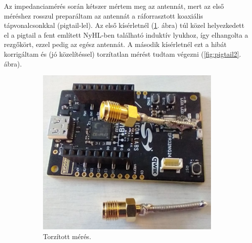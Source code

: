             \par
            Az impedanciamérés során kétszer mértem meg az antennát, mert az első méréshez rosszul preparáltam az antennát a ráforrasztott koaxiális tápvonalcsonkkal (pigtail-lel). Az első kísérletnél (\ref{fig:pigtail1}. ábra) túl közel helyezkedett el a pigtail a fent említett NyHL-ben található induktív lyukhoz, így elhangolta a rezgőkört, ezzel pedig az egész antennát. A második kísérletnél ezt a hibát korrigáltam és (jó közelítéssel) torzítatlan mérést tudtam végezni (\ref{fig:pigtail2}. ábra).
            \begin{figure}
                \centering
                \begin{subfigure}{0.35\textwidth}
                    \includegraphics[width=\textwidth]{kep/szerkesztett/pigtail1.jpg}
                    \caption{Torzított mérés.}
                    \label{fig:pigtail1}
                \end{subfigure}
                \begin{subfigure}{0.35\textwidth}

\end{subfigure}
\end{figure}
